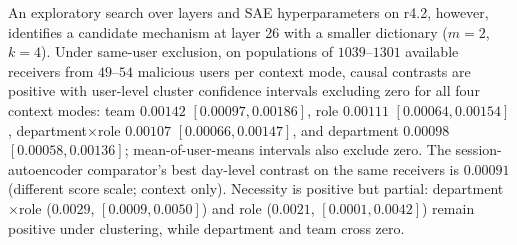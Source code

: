 \documentclass[10pt]{article} %
\newcommand{\rfour}{r4.2}
\begin{document}
An exploratory search over layers and SAE hyperparameters on \rfour{},
however, identifies a candidate mechanism at layer 26 with a smaller
dictionary ($m=2$, $k=4$). Under same-user exclusion, on populations of
$1039$--$1301$ available receivers from $49$--$54$ malicious users per context
mode, causal contrasts are positive with user-level cluster confidence
intervals excluding zero for all four context modes: team $0.00142$
$[0.00097, 0.00186]$, role $0.00111$ $[0.00064, 0.00154]$,
department$\times$role $0.00107$ $[0.00066, 0.00147]$, and department
$0.00098$ $[0.00058, 0.00136]$; mean-of-user-means intervals also exclude
zero. The session-autoencoder comparator's best day-level contrast on the same
receivers is $0.00091$ (different score scale; context only). Necessity is
positive but partial:
department$\times$role ($0.0029$, $[0.0009, 0.0050]$) and role ($0.0021$,
$[0.0001, 0.0042]$) remain positive under clustering, while department and
team cross zero.
\end{document}

